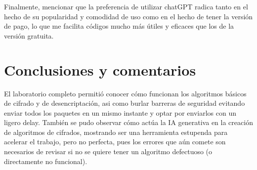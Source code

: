 \documentclass[letter,12pt]{article}
\begin{document}
Finalmente, mencionar que la preferencia de utilizar chatGPT radica tanto en el hecho de su popularidad y comodidad de uso como en el hecho de tener la versión de pago, lo que me facilita códigos mucho más útiles y eficaces que los de la versión gratuita.



\section*{Conclusiones y comentarios}
El laboratorio completo permitió conocer cómo funcionan los algoritmos básicos de cifrado y de desencriptación, asi como burlar barreras de seguridad evitando enviar todos los paquetes en un mismo instante y optar por enviarlos con un ligero delay. También se pudo observar cómo actúa la IA generativa en la creación de algoritmos de cifrados, mostrando ser una herramienta estupenda para acelerar el trabajo, pero no perfecta, pues los errores que aún comete son necesarios de revisar si no se quiere tener un algoritmo defectuoso 
(o directamente no funcional).
\end{document}
